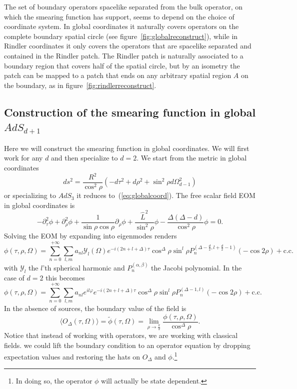\documentclass{PoS}
\newcommand{\LF}{\left(}
\newcommand{\RF}{\right)}
\newcommand{\Ym}{\ensuremath{\mathcal{Y}}}
\begin{document}
The set of boundary operators spacelike separated from the bulk operator, on which the smearing function has support, seems to depend on the choice of coordinate system. In global coordinates it naturally covers operators on the complete boundary spatial circle (see figure~\ref{fig:globalreconstruct}), while in Rindler coordinates it only covers the operators that are spacelike separated and contained in the Rindler patch. The Rindler patch is naturally associated to a boundary region that covers half of the spatial circle, but by an isometry the patch can be mapped to a patch that ends on any arbitrary spatial region $A$ on the boundary, as in figure~\ref{fig:rindlerreconstruct}.

\subsection{Construction of the smearing function in global $AdS_{d+1}$}
Here we will construct the smearing function in global coordinates. We will first work for any $d$ and then specialize to $d=2$. We start from the metric in global coordinates
\begin{equation}
ds^2 = \frac{R^2}{\cos^2\rho} \LF - d\tau^2  + d\rho^2 + \sin^2\rho d\Omega_{d-1}^2\RF
\end{equation}
or specializing to $AdS_3$ it reduces to~(\ref{eq:globalcoord}).
The free scalar field EOM in global coordinates is 
\begin{equation}
-\partial_\tau^2\phi + \partial_\rho^2\phi + \frac{1}{\sin\rho\cos\rho}\partial_\rho \phi + \frac{\hat{L}^2}{\sin^2\rho} \phi - \frac{\Delta(\Delta-d)}{\cos^2\rho}\phi = 0.
\end{equation} 
Solving the EOM by expanding into eigenmodes renders
\begin{equation}
\phi(\tau,\rho,\Omega) = \sum\limits_{n=0}^{+\infty} \sum\limits_{l,m} a_{nl} \Ym_l(\Omega) e^{-i (2n+l+\Delta)\tau} \cos^\Delta\rho \sin^l \rho P_n^{(\Delta-\frac{d}{2},l+\frac{d}{2}-1)}(-\cos 2\rho) + \text{c.c.}
\end{equation}
with $\Ym_l$ the $l$'th spherical harmonic and $P_n^{(\alpha,\beta)}$ the Jacobi polynomial. In the case of $d=2$ this becomes
\begin{equation}
\phi(\tau,\rho,\Omega) = \sum\limits_{n=0}^{+\infty} \sum\limits_{l,m} a_{nl} e^{il\varphi} e^{-i (2n+l+\Delta)\tau} \cos^\Delta\rho \sin^l \rho P_n^{(\Delta-1,l)}(-\cos 2\rho) + \text{c.c.}
\end{equation}
In the absence of sources, the boundary value of the field is
\begin{equation}
\langle O_\Delta (\tau,\Omega) \rangle = \tilde{\phi}(\tau,\Omega) = \lim\limits_{\rho\rightarrow \frac{\pi}{2}} \frac{\phi (\tau,\rho,\Omega)}{\cos^\Delta \rho}.
\end{equation}
Notice that instead of working with operators, we are working with classical fields. we could lift the boundary condition to an operator equation by dropping expectation values and restoring the hats on $O_\Delta$ and $\phi$.\footnote{In doing so, the operator $\phi$ will actually be state dependent.}\\
\end{document}
